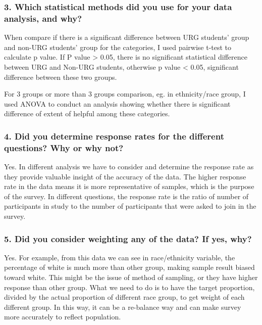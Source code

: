 \documentclass[
]{article}
\begin{document}
\hypertarget{which-statistical-methods-did-you-use-for-your-data-analysis-and-why}{%
\subsubsection{3. Which statistical methods did you use for your data
analysis, and
why?}\label{which-statistical-methods-did-you-use-for-your-data-analysis-and-why}}

When compare if there is a significant difference between URG students'
group and non-URG students' group for the categories, I used pairwise
t-test to calculate p value. If P value \textgreater{} 0.05, there is no
significant statistical difference between URG and Non-URG students,
otherwise p value \textless{} 0.05, significant difference between these
two groups.

For 3 groups or more than 3 groups comparison, eg. in ethnicity/race
group, I used ANOVA to conduct an analysis showing whether there is
significant difference of extent of helpful among these categories.

\hypertarget{did-you-determine-response-rates-for-the-different-questions-why-or-why-not}{%
\subsubsection{4. Did you determine response rates for the different
questions? Why or why
not?}\label{did-you-determine-response-rates-for-the-different-questions-why-or-why-not}}

Yes. In different analysis we have to consider and determine the
response rate as they provide valuable insight of the accuracy of the
data. The higher response rate in the data means it is more
representative of samples, which is the purpose of the survey. In
different questions, the response rate is the ratio of number of
participants in study to the number of participants that were asked to
join in the survey.

\hypertarget{did-you-consider-weighting-any-of-the-data-if-yes-why}{%
\subsubsection{5. Did you consider weighting any of the data? If yes,
why?}\label{did-you-consider-weighting-any-of-the-data-if-yes-why}}

Yes. For example, from this data we can see in race/ethnicity variable,
the percentage of white is much more than other group, making sample
result biased toward white. This might be the issue of method of
sampling, or they have higher response than other group. What we need to
do is to have the target proportion, divided by the actual proportion of
different race group, to get weight of each different group. In this
way, it can be a re-balance way and can make survey more accurately to
reflect population.
\end{document}
